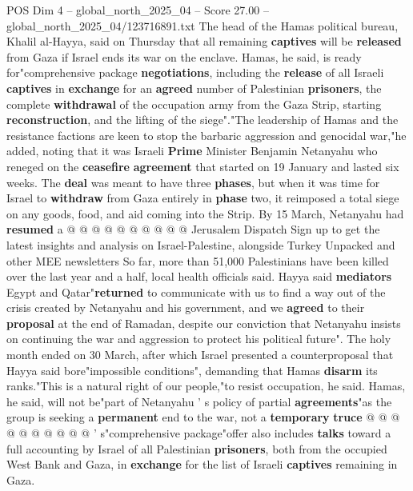 \begin{textsample}{POS Dim 4 – global\_north\_2025\_04 – Score 27.00 – global\_north\_2025\_04/123716891.txt}  \label{ex:f4_pos_222}
The head of the Hamas political bureau, Khalil al-Hayya, said on Thursday that all remaining \textbf{captives} will be \textbf{released} from Gaza if Israel ends its war on the enclave.
Hamas, he said, is ready for"comprehensive package \textbf{negotiations}, including the \textbf{release} of all Israeli \textbf{captives} in \textbf{exchange} for an \textbf{agreed} number of Palestinian \textbf{prisoners}, the complete \textbf{withdrawal} of the occupation army from the Gaza Strip, starting \textbf{reconstruction}, and the lifting of the siege"."The leadership of Hamas and the resistance factions are keen to stop the barbaric aggression and genocidal war,"he added, noting that it was Israeli \textbf{Prime} Minister Benjamin Netanyahu who reneged on the \textbf{ceasefire} \textbf{agreement} that started on 19 January and lasted six weeks.
The \textbf{deal} was meant to have three \textbf{phases}, but when it was time for Israel to \textbf{withdraw} from Gaza entirely in \textbf{phase} two, it reimposed a total siege on any goods, food, and aid coming into the Strip.
By 15 March, Netanyahu had \textbf{resumed} a @ @ @ @ @ @ @ @ @ @ Jerusalem Dispatch Sign up to get the latest insights and analysis on Israel-Palestine, alongside Turkey Unpacked and other MEE newsletters So far, more than 51,000 Palestinians have been killed over the last year and a half, local health officials said.
Hayya said \textbf{mediators} Egypt and Qatar"\textbf{returned} to communicate with us to find a way out of the crisis created by Netanyahu and his government, and we \textbf{agreed} to their \textbf{proposal} at the end of Ramadan, despite our conviction that Netanyahu insists on continuing the war and aggression to protect his political future".
The holy month ended on 30 March, after which Israel presented a counterproposal that Hayya said bore"impossible conditions", demanding that Hamas \textbf{disarm} its ranks."This is a natural right of our people,"to resist occupation, he said.
Hamas, he said, will not be"part of Netanyahu ' s policy of partial \textbf{agreements}"as the group is seeking a \textbf{permanent} end to the war, not a \textbf{temporary} \textbf{truce} @ @ @ @ @ @ @ @ @ @ ' s"comprehensive package"offer also includes \textbf{talks} toward a full accounting by Israel of all Palestinian \textbf{prisoners}, both from the occupied West Bank and Gaza, in \textbf{exchange} for the list of Israeli \textbf{captives} remaining in Gaza.

\end{textsample}
